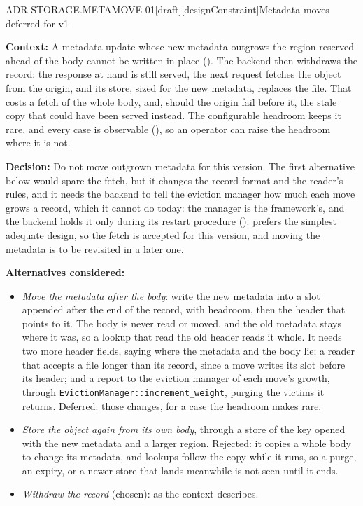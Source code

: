 \begin{requirement}{ADR-STORAGE.METAMOVE-01}[draft][designConstraint]{Metadata moves deferred for v1}


  \textbf{Context:} A metadata update whose new metadata outgrows the region
  reserved ahead of the body cannot be written in place
  (). The backend then withdraws the
  record: the response at hand is still served, the next request fetches
  the object from the origin, and its store, sized for the new metadata,
  replaces the file. That costs a fetch of the whole body, and, should the
  origin fail before it, the stale copy that could have been served
  instead. The configurable headroom keeps it rare, and every case is
  observable (), so an operator can
  raise the headroom where it is not.

  \textbf{Decision:} Do not move outgrown metadata for this version. The
  first alternative below would spare the fetch, but it changes the record
  format and the reader's rules, and it needs the backend to tell the
  eviction manager how much each move grows a record, which it cannot do
  today: the manager is the framework's, and the backend holds it only during
  its restart procedure ().
   prefers the simplest adequate design, so the
  fetch is accepted for this version, and moving the metadata is to be
  revisited in a later one.

  \textbf{Alternatives considered:}
  \begin{itemize}
    \item \emph{Move the metadata after the body}: write the new metadata
      into a slot appended after the end of the record, with headroom, then
      the header that points to it. The body is never read or moved, and the
      old metadata stays where it was, so a lookup that read the old header
      reads it whole. It needs two more header fields, saying where the
      metadata and the body lie; a reader that accepts a file longer than
      its record, since a move writes its slot before its header; and a
      report to the eviction manager of each move's growth, through
      \texttt{EvictionManager::increment\_weight}, purging the victims it
      returns. Deferred: those changes, for a case the headroom makes rare.
    \item \emph{Store the object again from its own body}, through a store
      of the key opened with the new metadata and a larger region. Rejected:
      it copies a whole body to change its metadata, and lookups follow the
      copy while it runs, so a purge, an expiry, or a newer store that lands
      meanwhile is not seen until it ends.
    \item \emph{Withdraw the record} (chosen): as the context describes.
  \end{itemize}


\end{requirement}
